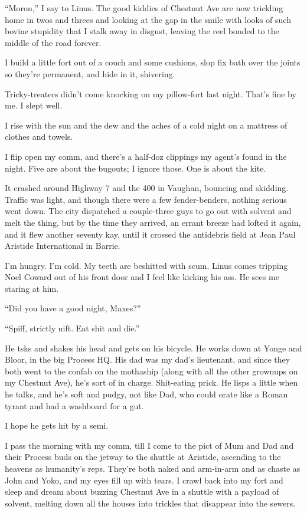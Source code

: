 ``Moron,'' I say to Linus. The good kiddies of Chestnut Ave are now
trickling home in twos and threes and looking at the gap in the
smile with looks of such bovine stupidity that I stalk away in
disgust, leaving the reel bonded to the middle of the road
forever.

I build a little fort out of a couch and some cushions, slop fix
bath over the joints so they're permanent, and hide in it,
shivering.

\tb

Tricky-treaters didn't come knocking on my pillow-fort last night.
That's fine by me. I slept well.

I rise with the sun and the dew and the aches of a cold night on a
mattress of clothes and towels.

I flip open my comm, and there's a half-doz clippings my agent's
found in the night. Five are about the bugouts; I ignore those. One
is about the kite.

It crashed around Highway 7 and the 400 in Vaughan, bouncing and
skidding. Traffic was light, and though there were a few
fender-benders, nothing serious went down. The city dispatched a
couple-three guys to go out with solvent and melt the thing, but by
the time they arrived, an errant breeze had lofted it again, and it
flew another seventy kay, until it crossed the antidebris field at
Jean Paul Aristide International in Barrie.

I'm hungry. I'm cold. My teeth are beshitted with scum. Linus comes
tripping Noel Coward out of his front door and I feel like kicking
his ass. He sees me staring at him.

``Did you have a good night, Maxes?''

``Spiff, strictly nift. Eat shit and die.''

He tsks and shakes his head and gets on his bicycle. He works down
at Yonge and Bloor, in the big Process HQ. His dad was my dad's
lieutenant, and since they both went to the confab on the mothaship
(along with all the other grownups on my Chestnut Ave), he's sort
of in charge. Shit-eating prick. He lisps a little when he talks,
and he's soft and pudgy, not like Dad, who could orate like a Roman
tyrant and had a washboard for a gut.

I hope he gets hit by a semi.

\tb

I pass the morning with my comm, till I come to the pict of Mum and
Dad and their Process buds on the jetway to the shuttle at
Aristide, ascending to the heavens as humanity's reps. They're both
naked and arm-in-arm and as chaste as John and Yoko, and my eyes
fill up with tears. I crawl back into my fort and sleep and dream
about buzzing Chestnut Ave in a shuttle with a payload of solvent,
melting down all the houses into trickles that disappear into the
sewers.

